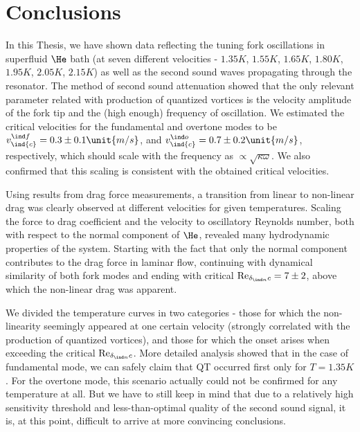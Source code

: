 \newpage

\chapter{Conclusions}

In this Thesis, we have shown data reflecting the tuning fork oscillations in superfluid $ \He $ bath (at seven different velocities - $ 1.35\unit{K} $, $ 1.55\unit{K} $, $ 1.65\unit{K} $, $ 1.80\unit{K} $, $ 1.95\unit{K} $, $ 2.05\unit{K} $, $ 2.15\unit{K} $) as well as the second sound waves propagating through the resonator. The method of second sound attenuation showed that the only relevant parameter related with production of quantized vortices is the velocity amplitude of the fork tip and the (high enough) frequency of oscillation. We estimated the critical velocities for the fundamental and overtone modes to be $ v_{\ind{c}}^{\ind f} = 0.3 \pm 0.1 \unit{m/s}$, and $ v_{\ind{c}}^{\ind o} = 0.7 \pm 0.2 \unit{m/s} $, respectively, which should scale with the frequency as $ \propto \sqrt{\kappa\omega} $. We also confirmed that this scaling is consistent with the obtained critical velocities.

Using results from drag force measurements, a transition from linear to non-linear drag was clearly observed at different velocities for given temperatures. Scaling the force to drag coefficient and the velocity to oscillatory Reynolds number, both with respect to the normal component of $ \He $, revealed many hydrodynamic properties of the system. Starting with the fact that only the normal component contributes to the drag force in laminar flow, continuing with dynamical similarity of both fork modes and ending with critical $\text{Re}_{\delta_{\ind n}c}=7\pm 2 $, above which the non-linear drag was apparent.

We divided the temperature curves in two categories - those for which the non-linearity seemingly appeared at one certain velocity (strongly correlated with the production of quantized vortices), and those for which the onset arises when exceeding the critical $\text{Re}_{\delta_{\ind n}c}$. More detailed analysis showed that in the case of fundamental mode, we can safely claim that QT occurred first only for $ T = 1.35\unit{K} $. For the overtone mode, this scenario actually could not be confirmed for any temperature at all. But we have to still keep in mind that due to a relatively high sensitivity threshold and less-than-optimal quality of the second sound signal, it is, at this point, difficult to arrive at more convincing conclusions. 

